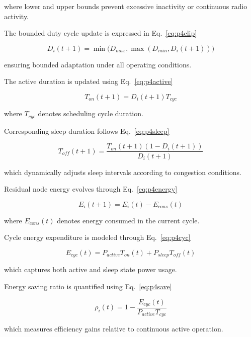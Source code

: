 \documentclass[a4paper,fleqn,final,1p]{cas-dc}
\numberwithin{equation}{section}
\begin{document}
where lower and upper bounds prevent excessive inactivity or continuous radio activity.

The bounded duty cycle update is expressed in Eq.~\ref{eq:p4clip}

\begin{equation}
D_i(t+1)=
\min
\Big(
D_{max},
\max
(D_{min},D_i(t+1))
\Big)
\label{eq:p4clip}
\end{equation}

ensuring bounded adaptation under all operating conditions.

The active duration is updated using Eq.~\ref{eq:p4active}

\begin{equation}
T_{on}(t+1)=
D_i(t+1)
T_{cyc}
\label{eq:p4active}
\end{equation}

where $T_{cyc}$ denotes scheduling cycle duration.

Corresponding sleep duration follows Eq.~\ref{eq:p4sleep}

\begin{equation}
T_{off}(t+1)=
\frac{
T_{on}(t+1)
(1-D_i(t+1))
}{
D_i(t+1)
}
\label{eq:p4sleep}
\end{equation}

which dynamically adjusts sleep intervals according to congestion conditions.

Residual node energy evolves through Eq.~\ref{eq:p4energy}

\begin{equation}
E_i(t+1)=
E_i(t)
-
E_{cons}(t)
\label{eq:p4energy}
\end{equation}

where $E_{cons}(t)$ denotes energy consumed in the current cycle.

Cycle energy expenditure is modeled through Eq.~\ref{eq:p4cyc}

\begin{equation}
E_{cyc}(t)=
P_{active}T_{on}(t)
+
P_{sleep}T_{off}(t)
\label{eq:p4cyc}
\end{equation}

which captures both active and sleep state power usage.

Energy saving ratio is quantified using Eq.~\ref{eq:p4save}

\begin{equation}
\rho_i(t)=
1-
\frac{
E_{cyc}(t)
}{
P_{active}T_{cyc}
}
\label{eq:p4save}
\end{equation}

which measures efficiency gains relative to continuous active operation.
\end{document}
